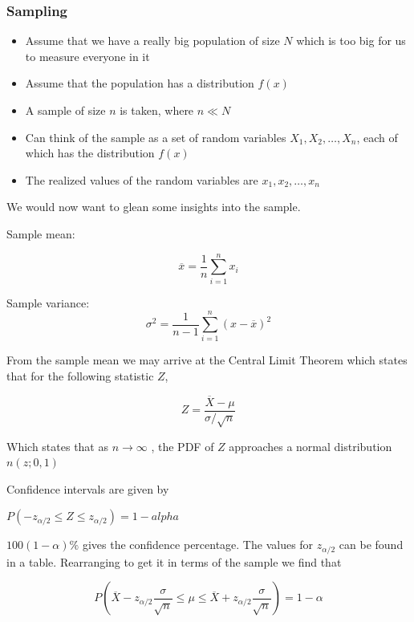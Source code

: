 \documentclass[10pt]{article}
\begin{document}
\subsubsection{Sampling}

\begin{itemize}
	\item Assume that we have a really big population of size $ N $ which is too big for us to measure everyone in it
	\item Assume that the population has a distribution $ f(x) $ 	
	\item A sample of size $ n $ is taken, where $ n \ll N $ 
	\item Can think of the sample as a set of random variables $ X_1, X_2, \ldots, X_n $, each of which has the distribution $ f(x) $ 
	\item The realized values of the random variables are $ x_1, x_2, \ldots, x_n $
\end{itemize}


We would now want to glean some insights into the sample.


Sample mean:

\begin{equation}
	\overline{x} = \frac{1}{n} \sum^n_{i=1} x_i
\end{equation}

Sample variance:
\begin{equation}
	\sigma^2 = \frac{1}{n-1} \sum^n_{i=1} (x- \overline{x})^2
\end{equation}


From the sample mean we may arrive at the Central Limit Theorem which states that for the following statistic $ Z $,

\begin{equation}
	Z = \frac{\overline{X} - \mu}{\sigma / \sqrt{n} }
\end{equation}

Which states that as $ n \to \infty$ , the PDF of $ Z $ approaches a normal distribution $ n (z; 0, 1) $ 


Confidence intervals are given by

$ P(-z_{\alpha / 2} \le Z \le z_{\alpha /2}) = 1 - alpha $ 

$ 100(1-\alpha)\% $ gives the confidence percentage.
The values for $ z_{\alpha /2} $ can be found in a table.
Rearranging to get it in terms of the sample we find that


\begin{equation}
	P(
	\overline{X} - z_{\alpha /2} \frac{\sigma}{\sqrt{n} }
	\le  \mu \le 
	\overline{X} + z_{\alpha /2} \frac{\sigma}{\sqrt{n} }
	) = 1 - \alpha
\end{equation}
\end{document}
